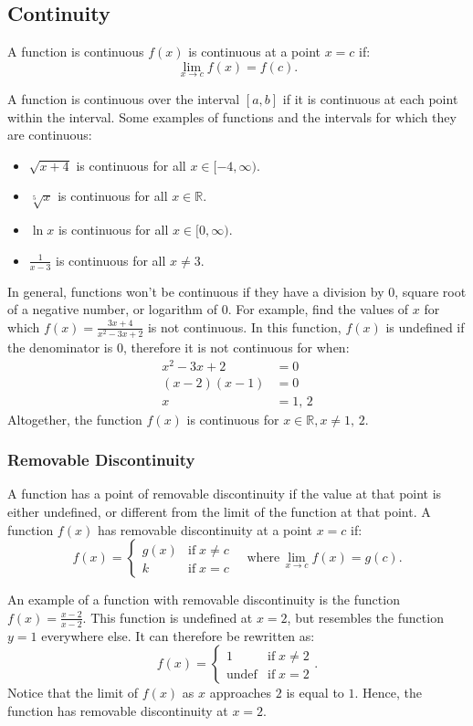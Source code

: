 \documentclass[12pt]{article}
\newcommand{\R}{\mathbb{R}} %
\begin{document}
\subsection{Continuity}
A function is continuous $f(x)$ is continuous at a point $x = c$ if:
\[ \lim_{x \to c} f(x) = f(c). \] %

A function is continuous over the interval $[a, b]$ if it is continuous at each point within the interval. Some examples of functions and the intervals for which they are continuous:
\begin{itemize}
	\item $\sqrt{x + 4}$ is continuous for all $x \in [-4, \infty)$.
	\item $\sqrt[5]{x}$ is continuous for all $x \in \R$.
	\item $\ln x$ is continuous for all $x \in [0, \infty)$.
	\item $\frac{1}{x - 3}$ is continuous for all $x \ne 3$.
\end{itemize}

In general, functions won't be continuous if they have a division by $0$, square root of a negative number, or logarithm of $0$. For example, find the values of $x$ for which $f(x) = \frac{3x + 4}{x^2 - 3x + 2}$ is not continuous. In this function, $f(x)$ is undefined if the denominator is $0$, therefore it is not continuous for when:
\begin{align*}
	x^2 - 3x + 2 &= 0 \\
	(x - 2)(x - 1) &= 0 \\
	x &= 1, \, 2
\end{align*}
Altogether, the function $f(x)$ is continuous for $x \in \R, x \ne 1, \, 2$.

\subsubsection{Removable Discontinuity}
A function has a point of removable discontinuity if the value at that point is either undefined, or different from the limit of the function at that point. A function $f(x)$ has removable discontinuity at a point $x = c$ if:
\[ f(x) = \begin{cases}
		g(x) & \text{if} \; x \ne c \\
		k    & \text{if} \; x = c
	\end{cases} \quad \text{where} \, \lim_{x \to c} f(x) = g(c).\]

An example of a function with removable discontinuity is the function $f(x) = \frac{x - 2}{x - 2}$. This function is undefined at $x = 2$, but resembles the function $y = 1$ everywhere else. It can therefore be rewritten as:
\[ f(x) = \begin{cases}
    1 & \text{if} \; x \ne 2 \\
    \text{undef} & \text{if} \; x = 2
\end{cases}. \]
Notice that the limit of $f(x)$ as $x$ approaches $2$ is equal to $1$. Hence, the function has removable discontinuity at $x = 2$.
\end{document}
